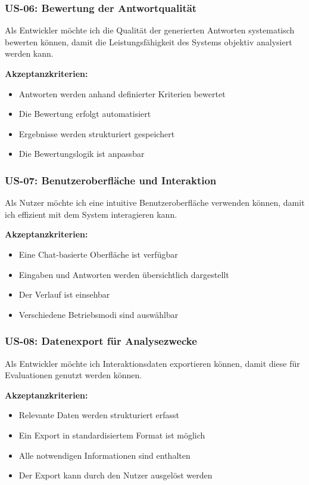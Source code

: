 \subsubsection*{US-06: Bewertung der Antwortqualität}

Als Entwickler möchte ich die Qualität der generierten Antworten systematisch bewerten können, damit die Leistungsfähigkeit des Systems objektiv analysiert werden kann.

\textbf{Akzeptanzkriterien:}
\begin{itemize}
\item Antworten werden anhand definierter Kriterien bewertet
\item Die Bewertung erfolgt automatisiert
\item Ergebnisse werden strukturiert gespeichert
\item Die Bewertungslogik ist anpassbar
\end{itemize}

\subsubsection*{US-07: Benutzeroberfläche und Interaktion}

Als Nutzer möchte ich eine intuitive Benutzeroberfläche verwenden können, damit ich effizient mit dem System interagieren kann.

\textbf{Akzeptanzkriterien:}
\begin{itemize}
\item Eine Chat-basierte Oberfläche ist verfügbar
\item Eingaben und Antworten werden übersichtlich dargestellt
\item Der Verlauf ist einsehbar
\item Verschiedene Betriebsmodi sind auswählbar
\end{itemize}

\subsubsection*{US-08: Datenexport für Analysezwecke}

Als Entwickler möchte ich Interaktionsdaten exportieren können, damit diese für Evaluationen genutzt werden können.

\textbf{Akzeptanzkriterien:}
\begin{itemize}
\item Relevante Daten werden strukturiert erfasst
\item Ein Export in standardisiertem Format ist möglich
\item Alle notwendigen Informationen sind enthalten
\item Der Export kann durch den Nutzer ausgelöst werden
\end{itemize}

